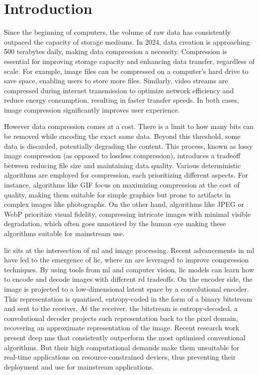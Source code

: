 \chapter*{Introduction}
Since the beginning of computers, the volume of raw data has consistently outpaced the capacity of storage mediums. In 2024, data creation is approaching 500 terabytes daily, making data compression a necessity. Compression is essential for improving storage capacity and enhancing data transfer, regardless of scale. For example, image files can be compressed on a computer's hard drive to save space, enabling users to store more files. Similarly, video streams are compressed during internet transmission to optimize network efficiency and reduce energy consumption, resulting in faster transfer speeds. In both cases, image compression significantly improves user experience.

However data compression comes at a cost. There is a limit to how many bits can be removed while encoding the exact same data. Beyond this threshold, some data is discarded, potentially degrading the content. This process, known as lossy image compression (as opposed to lossless compression), introduces a tradeoff between reducing file size and maintaining data quality. Various deterministic algorithms are employed for compression, each prioritizing different aspects. For instance, algorithms like GIF focus on maximizing compression at the cost of quality, making them suitable for simple graphics but prone to artifacts in complex images like photographs. On the other hand, algorithms like JPEG or WebP prioritize visual fidelity, compressing intricate images with minimal visible degradation, which often goes unnoticed by the human eye making these algorithms suitable for mainstream use.


\acrfull{lic} sits at the intersection of \acrfull{ml} and image processing. Recent advancements in \acrshort{ml} have led to the emergence of \acrshort{lic}, where \acrfull{nn} are leveraged to improve compression techniques. By using tools from \acrshort{ml} and computer vision, \acrshort{lic} models can learn how to encode and decode images with different \acrfull{rd} tradeoffs. On the encoder side, the image is projected to a low-dimensional latent space by a convolutional encoder. This representation is quantised, entropy-coded in the form of a binary bitstream and sent to the receiver. At the receiver, the bitstream is entropy-decoded, a convolutional decoder projects such representation back to the pixel domain, recovering an approximate representation of the image. Recent research work present deep \acrshort{nn}s that consistently outperform the most optimised conventional algorithms. But their high computational demands make them unsuitable for real-time applications on resource-constrained devices, thus preventing their deployment and use for mainstream applications.

